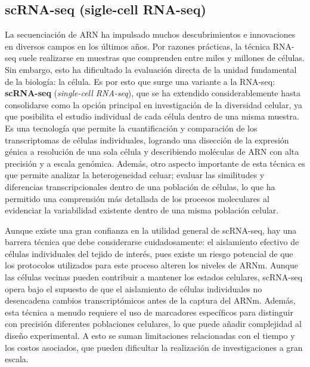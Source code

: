 \subsection{scRNA-seq (sigle-cell RNA-seq)}

La secuenciación de ARN ha impulsado muchos descubrimientos e innovaciones en diversos campos en los últimos años. Por razones prácticas, la técnica RNA-seq
suele realizarse en muestras que comprenden entre miles y millones de células. Sin embargo, esto ha dificultado la evaluación directa de la unidad fundamental
de la biología: la célula. Es por esto que surge una variante a la RNA-seq: \textbf{scRNA-seq} (\textit{single-cell RNA-seq}), que se ha extendido considerablemente hasta 
consolidarse como la opción principal en investigación de la diversidad celular, ya que posibilita el estudio individual de cada célula dentro de una misma muestra. 
Es una tecnología que permite la cuantificación y comparación de los transcriptomas de células individuales, logrando una disección de la expresión génica a resolución de una 
sola célula y describiendo moléculas de ARN con alta precisión y a escala genómica. Además, otro aspecto importante de esta técnica es que permite analizar 
la heterogeneidad celuar; evaluar las similitudes y diferencias transcripcionales dentro de una población de células, lo que ha permitido una comprensión más 
detallada de los procesos moleculares al evidenciar la variabilidad existente dentro de una misma población celular. \newline

Aunque existe una gran confianza en la utilidad general de scRNA-seq, hay una barrera técnica que debe considerarse cuidadosamente: el aislamiento efectivo de 
células individuales del tejido de interés, pues existe un riesgo potencial de que los protocolos utilizados para este proceso alteren los niveles de ARNm. 
Aunque las células vecinas pueden contribuir a mantener los estados celulares, scRNA-seq opera bajo el supuesto de que el aislamiento de células individuales 
no desencadena cambios transcriptómicos antes de la captura del ARNm. Además, esta técnica a menudo requiere el uso de marcadores específicos para distinguir 
con precisión diferentes poblaciones celulares, lo que puede añadir complejidad al diseño experimental. A esto se suman limitaciones relacionadas con el tiempo 
y los costos asociados, que pueden dificultar la realización de investigaciones a gran escala. \newline

